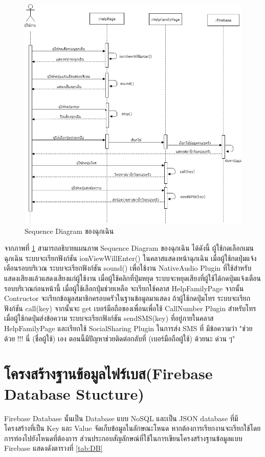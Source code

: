 \begin{figure}[H]
	\centering
	\includegraphics[width=1.0\columnwidth]
	{Figures/3/Sequence/danger}
	\caption{Sequence Diagram ของฉุกเฉิน}
	\label{Fig:Sequence-danger}
\end{figure}

\newpage
จากภาพที่ \ref{Fig:Sequence-danger} สามารถอธิบายแผนภาพ Sequence Diagram ของฉุกเฉิน ได้ดังนี้ 
ผู้ใช้กดเลือกเมนฉุกเฉิน ระบบจะเรียกฟังก์ชัน ionViewWillEnter() ในคลาสแสดงหน้าฉุกเฉิน เมื่อผู้ใช้กดปุ่มแจ้งเตือนรอบบริเวณ ระบบจะเรียกฟังก์ชัน sound() เพื่อใช้งาน NativeAudio Plugin ที่ใช้สำหรับแสดงเสียงแล้วแสดงเสียงแก่ผู้ใช้งาน 
เมื่อผู้ใช้คลิกที่ปุ่มหยุด ระบบจะหยุดเสียงที่ผู้ใช้ได้กดปุ่มแจ้งเตือนรอบบริเวณก่อนหน้านี้ เมื่อผู้ใช้เลือกปุ่มช่วยเหลือ จะเรียกใช้คลาส HelpFamilyPage จากนั้น Contructor จะเรียกข้อมูลสมาชิกครอบครัวในฐานข้อมูลมาแสดง 
ถ้าผู้ใช้กดปุ่มโทร ระบบจะเรียกฟังก์ชัน call(key) จากนั้นจะ get เบอร์มือถือของเพื่อนเพื่อใช้ CallNumber Plugin สำหรับโทร เมื่อผู้ใช้กดปุ่มส่งข้อความ ระบบจะเรียกฟังก์ชัน sendSMS(key) ที่อยู่ภายในคลาส HelpFamilyPage และเรียกใช้ SocialSharing Plugin ในการส่ง SMS ที่
มีข้อความว่า "ช่วยด้วย !!! นี่ (ชื่อผู้ใช้) เอง ตอนนี้มีปัญหาช่วยติดต่อกลับที่ (เบอร์มือถือผู้ใช้) ด้วยนะ ด่วน ๆ"
\newpage




	
\section{โครงสร้างฐานข้อมูลไฟร์เบส(Firebase Database Stucture)}
Firebase Database นั้นเป็น Database แบบ NoSQL และเป็น JSON database ที่มีโครงสร้างที่เป็น Key และ Value จัดเก็บข้อมูลในลักษณะโหนด หากต้องการเรียกงานจะเรียกใช้โดย
การท่องไปยังโหนดที่ต้องการ ส่วนประกอบสัญลักษณ์ที่ใช้ในการเขียนโครงสร้างฐานข้อมูลแบบ Firebase
แสดงดังตารางที่ \ref{tab:DB}

